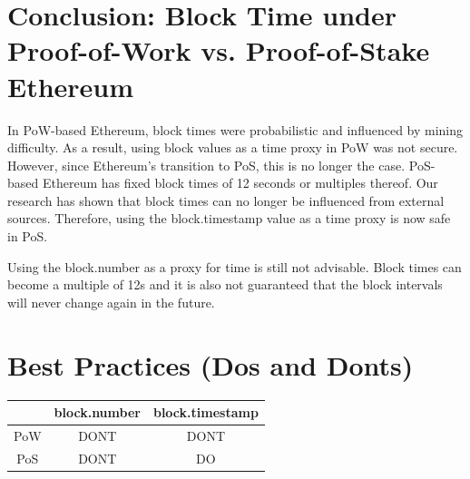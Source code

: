 \section{Conclusion: Block Time under Proof-of-Work vs. Proof-of-Stake Ethereum}
In PoW-based Ethereum, block times were probabilistic and influenced by mining difficulty.
As a result, using block values as a time proxy in PoW was not secure.
However, since Ethereum's transition to PoS, this is no longer the case.
PoS-based Ethereum has fixed block times of 12 seconds or multiples thereof.
Our research has shown that block times can no longer be influenced from external sources.
Therefore, using the block.timestamp value as a time proxy is now safe in PoS.

Using the block.number as a proxy for time is still not advisable. Block times 
can become a multiple of 12s and it is also not guaranteed that the block intervals will
never change again in the future.

\section{Best Practices (Dos and Donts)}

\begin{center}
  \begin{tabular}{ c c c }
   \hline
   & block.number & block.timestamp \\ [0.5ex] 
  \hline
   PoW & DONT & DONT \\ 
   PoS & DONT & DO \\  
  \end{tabular}
  \end{center}